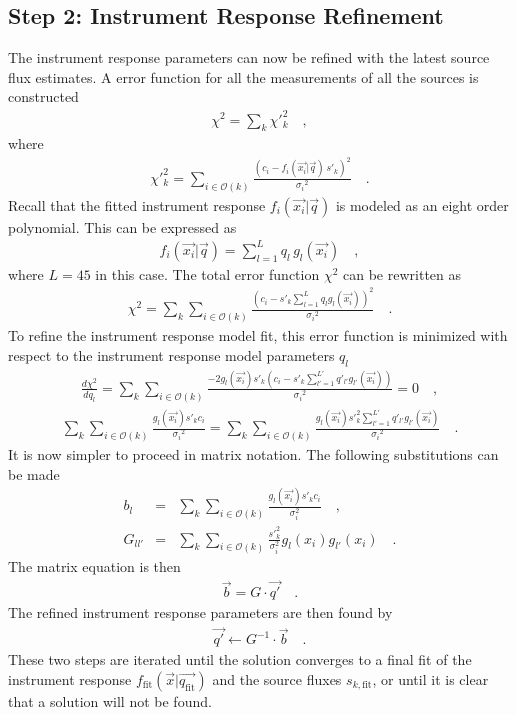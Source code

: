\documentclass[manuscript]{aastex}
\newcommand{\fit}{\text{fit}}
\begin{document}
\subsection{Step 2: Instrument Response Refinement}
The instrument response parameters can now be refined with the latest source flux estimates. A error function for all the measurements of all the sources is constructed
\begin{eqnarray*}
\chi^2 = \sum_{k} \chi'^2_k \quad ,
\end{eqnarray*}
where
\begin{eqnarray*}
\chi'^2_k = \sum_{i \in \mathcal{O}(k)} \frac{(c_i-f_{i}(\vec{x_i} | \vec{q}) \, s'_{k})^2}{{\sigma_i}^2}  \quad .
\end{eqnarray*}
Recall that the fitted instrument response $f_{i}(\vec{x_i} | \vec{q})$ is modeled as an eight order polynomial. This can be expressed as
\begin{eqnarray*}
f_{i}(\vec{x_i} | \vec{q}) = \sum_{l = 1}^L q_{l} \, g_l(\vec{x_i})  \quad ,
\end{eqnarray*}
where $L = 45$ in this case. The total error function $\chi^2$ can be rewritten as
\begin{eqnarray*}
\chi^2 =\sum_{k} \sum_{i \in \mathcal{O}(k)} \frac{(c_i- s'_{k} \sum_{l = 1}^L q_{l} g_l(\vec{x_i}))^2}{{\sigma_i}^2}   \quad .
\end{eqnarray*}
To refine the instrument response model fit, this error function is minimized with respect to the instrument response model parameters $q_{l}$
\begin{eqnarray*}
\frac{d\chi^2}{dq_{l}} = \sum_{k} \sum_{i \in \mathcal{O}(k)} \frac{-2 g_l(\vec{x_i}) s'_{k} (c_i- s'_{k} \sum_{l' = 1}^{L'} q'_{l'} g_{l'}(\vec{x_i}))}{{\sigma_i}^2} = 0  \quad ,
\end{eqnarray*}
\begin{eqnarray*}
\sum_{k} \sum_{i \in \mathcal{O}(k)} \frac{g_l(\vec{x_i}) s'_{k} c_i}{{\sigma_i}^2} = \sum_{k} \sum_{i \in \mathcal{O}(k)} \frac{g_l (\vec{x_i}) s'^2_{k} \sum_{l' = 1}^{L'} q'_{l'} g_{l'} (\vec{x_i})} {{\sigma_i}^2}   \quad .
\end{eqnarray*}
It is now simpler to proceed in matrix notation. The following substitutions can be made
\begin{eqnarray}
b_l & = & \sum_{k} \sum_{i \in \mathcal{O}(k)} \frac{g_l(\vec{x_i}) s'_{k} c_i}{\sigma_i^2}    \quad ,\\
G_{ll'} & = & \sum_{k} \sum_{i \in \mathcal{O}(k)} \frac{{s'}_{k}^2}{\sigma_i^2} g_l(x_i) g_{l'}(x_i)   \quad .
\end{eqnarray}
The matrix equation is then
\begin{eqnarray*}
\vec{b} = G \cdot \vec{q'}    \quad .
\end{eqnarray*}
The refined instrument response parameters are then found by
\begin{eqnarray*}
\vec{q'} \leftarrow G^{-1}  \cdot \vec{b}   \quad .
\end{eqnarray*}
These two steps are iterated until the solution converges to a final fit of the instrument response $f_\fit(\vec{x} | \vec{q_\fit})$ and the source fluxes $s_{k,\fit}$, or until it is clear that a solution will not be found. 
\end{document}
